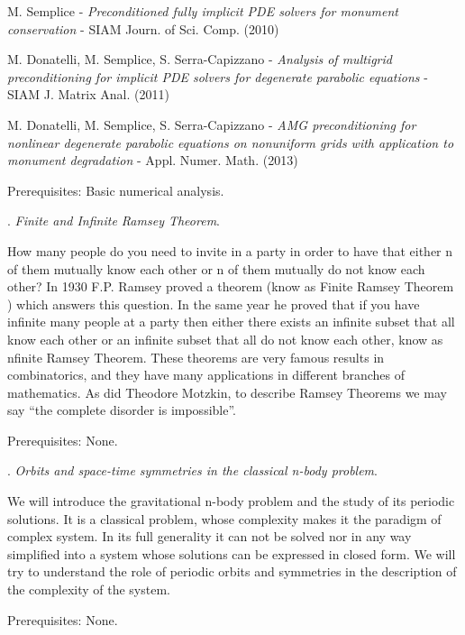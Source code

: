 \documentclass{article}
\def\noi{\noindent}
\begin{document}
\noi [3] M. Semplice - {\it Preconditioned fully implicit PDE solvers for monument conservation} - SIAM Journ. of Sci. Comp. (2010)

\noi [4] M. Donatelli, M. Semplice, S. Serra-Capizzano - {\it Analysis of multigrid preconditioning for implicit PDE solvers  for degenerate parabolic equations} - SIAM J. Matrix Anal. (2011)

\noi [5] M. Donatelli, M. Semplice, S. Serra-Capizzano - {\it AMG  preconditioning for nonlinear degenerate   parabolic equations on nonuniform grids with application to monument degradation} - Appl. Numer. Math. (2013)


\noi Prerequisites: Basic numerical analysis.

\vspace{22.9pt}


\noi {\bf Silvia Steila}.
{\it Finite and Infinite Ramsey Theorem}.

\noi How many people do you need to invite in a party in order to have that either n of them mutually know each other or n of them mutually do not know each other? In 1930 F.P. Ramsey proved a theorem (know as Finite Ramsey Theorem ) which answers this question. In the same year he proved that if you have infinite many people at a party then either there exists an infinite subset that all know each other or an infinite subset that all do not know each other, know as  nfinite Ramsey Theorem. These theorems are very famous results in combinatorics, and they have many applications in different branches of mathematics. As did Theodore Motzkin, to describe Ramsey Theorems we may say ``the complete disorder is impossible''.

\noi Prerequisites: None.

\vspace{22.9pt}

\noi {\bf Susanna Terracini}.
{\it Orbits and space-time symmetries in the classical n-body problem}.

\noi We will introduce the gravitational n-body problem and the study of its periodic solutions. It is a classical problem, whose complexity makes it the paradigm of complex system. In its full generality it can not be solved nor in any way simplified into a system whose solutions can be expressed in closed form.
We will try to understand the role of periodic orbits and symmetries in the description of the complexity of the system.

\noi Prerequisites: None.

\vspace{22.9pt}
\end{document}
